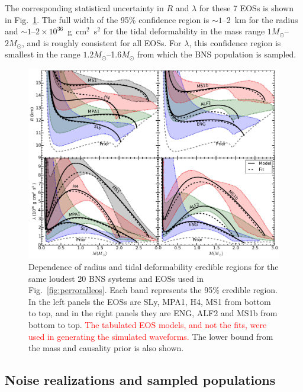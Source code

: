 \documentclass[twocolumn,prd,amssymb,aps,nofootinbib,showpacs,epsf]{revtex4}
\newcommand{\red}{\textcolor{red}}
\newcommand\ben[2]{\textcolor{red}{{#1}\sout{#2}}}
\begin{document}
The corresponding statistical uncertainty in $R$ and $\lambda$ for these 7 EOSs is shown in Fig.~\ref{fig:structurealleos}. 
The full width of the 95\% confidence region is $\sim 1$--2~km for the radius and $\sim 1$--$2\times 10^{36}$~g~cm$^2$~s$^2$ for the tidal deformability in the mass range $1M_\odot$--$2M_\odot$, and is roughly consistent for all EOSs. For $\lambda$, this confidence region is smallest in the range $1.2M_\odot$--1.6$M_\odot$ from which the BNS population is sampled.


\begin{figure}[!htb]
\begin{center}
\includegraphics[width=6.4in]{constraintsalleos.pdf}
\caption{Dependence of radius and tidal deformability credible regions for the same loudest 20 BNS systems and EOSs used in Fig.~\ref{fig:perroralleos}. Each band represents the 95\% credible region. In the left panels the EOSs are SLy, MPA1, H4, MS1 from bottom to top, and in the right panels they are ENG, ALF2 and MS1b from bottom to top. \ben{The tabulated EOS models, and not the fits, were used in generating the simulated waveforms.}{} The lower bound from the mass and causality prior is also shown.}
\label{fig:structurealleos}
\end{center}
\end{figure}

\subsection{Noise realizations and sampled populations}
\end{document}
